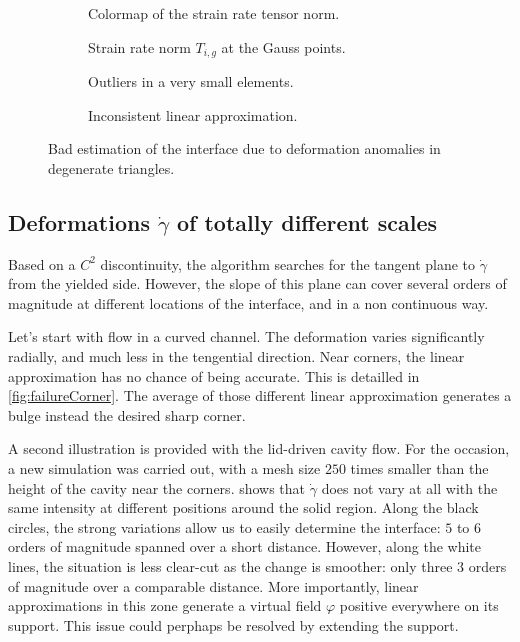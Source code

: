 \documentclass[11 pt]{report}
\begin{document}
\begin{figure}
    \centering
    \begin{subfigure}[t]{0.495\textwidth}
        
        \caption{Colormap of the strain rate tensor norm.}
    \end{subfigure}
    \begin{subfigure}[t]{0.495\textwidth}
        
        \caption{Strain rate norm $T_{i,g}$ at the Gauss points.}
    \end{subfigure}\vspace{6pt}
    \begin{subfigure}[t]{0.495\textwidth}
        
        \caption{Outliers in a very small elements.}
    \end{subfigure}
    \begin{subfigure}[t]{0.495\textwidth}
        
        \caption{Inconsistent linear approximation.}
    \end{subfigure}\vspace{6pt}
    \caption{Bad estimation of the interface due to deformation anomalies in degenerate triangles.}
    \label{fig:failureCap}
\end{figure}

\subsection{Deformations $\dot\gamma$ of totally different scales}
Based on a $C^2$ discontinuity, the algorithm searches for the tangent plane to $\dot \gamma$ from the yielded side. However, the slope of this plane can cover several orders of magnitude at different locations of the interface, and in a non continuous way.

Let's start with flow in a curved channel. The deformation varies significantly radially, and much less in the tengential direction. Near corners, the linear approximation has no chance of being accurate. This is detailled in \cref{fig:failureCorner}. The average of those different linear approximation generates a bulge instead the desired sharp corner.

A second illustration is provided with the lid-driven cavity flow. For the occasion, a new simulation was carried out, with a mesh size $250$ times smaller than the height of the cavity near the corners.  shows that $\dot \gamma$ does not vary at all with the same intensity at different positions around the solid region. Along the black circles, the strong variations allow us to easily determine the interface: $5$ to $6$ orders of magnitude spanned over a short distance. However, along the white lines, the situation is less clear-cut as the change is smoother: only three $3$ orders of magnitude over a comparable distance. More importantly, linear approximations in this zone generate a virtual field $\varphi$ positive everywhere on its support. This issue could perphaps be resolved by extending the support.
\end{document}
